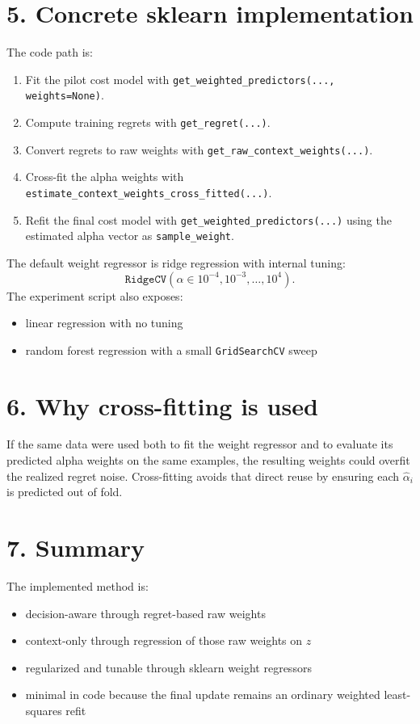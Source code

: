 \documentclass[11pt]{article}
\begin{document}
\section*{5. Concrete sklearn implementation}

The code path is:

\begin{enumerate}
\item Fit the pilot cost model with \texttt{get\_weighted\_predictors(..., weights=None)}.
\item Compute training regrets with \texttt{get\_regret(...)}.
\item Convert regrets to raw weights with \texttt{get\_raw\_context\_weights(...)}.
\item Cross-fit the alpha weights with \texttt{estimate\_context\_weights\_cross\_fitted(...)}.
\item Refit the final cost model with \texttt{get\_weighted\_predictors(...)} using the estimated alpha vector as \texttt{sample\_weight}.
\end{enumerate}

The default weight regressor is ridge regression with internal tuning:
\[
  \texttt{RidgeCV}(\alpha \in 10^{-4}, 10^{-3}, \dots, 10^4).
\]
The experiment script also exposes:

\begin{itemize}
\item linear regression with no tuning
\item random forest regression with a small \texttt{GridSearchCV} sweep
\end{itemize}

\section*{6. Why cross-fitting is used}

If the same data were used both to fit the weight regressor and to evaluate its
predicted alpha weights on the same examples, the resulting weights could
overfit the realized regret noise. Cross-fitting avoids that direct reuse by
ensuring each $\hat\alpha_i$ is predicted out of fold.

\section*{7. Summary}

The implemented method is:

\begin{itemize}
\item decision-aware through regret-based raw weights
\item context-only through regression of those raw weights on $z$
\item regularized and tunable through sklearn weight regressors
\item minimal in code because the final update remains an ordinary weighted
least-squares refit
\end{itemize}
\end{document}
